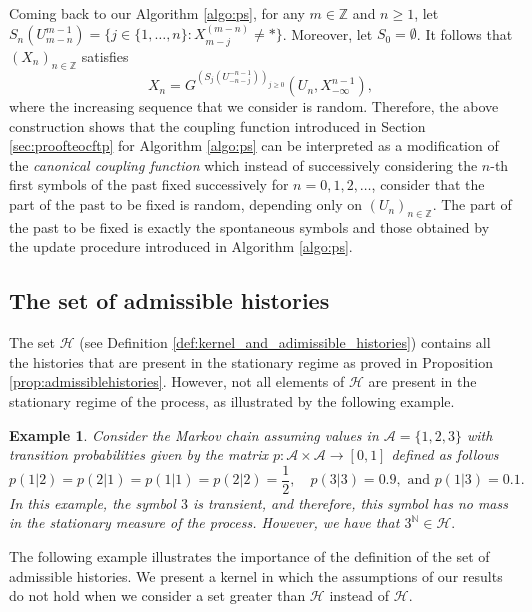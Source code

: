 \documentclass[a4paper]{article}
\newtheorem{example}[theorem]{Example}
\newcommand{\Z}{\mathbb{Z}}
\newcommand{\N}{\mathbb{N}}
\renewcommand{\H}{\mathcal{H}}
\newcommand{\A}{\mathcal{A}}
\begin{document}
Coming back to our Algorithm \ref{algo:ps}, for any $m\in \Z$ and $n\geq 1$, let $S_n(U_{m-n}^{m-1})=\{j\in \{1,\ldots,n\}: X^{(m-n)}_{m-j}\neq *\}$. Moreover, let $S_0=\emptyset$.
It follows that $(X_n)_{n\in \Z}$ satisfies
$$
X_n=G^{(S_j(U_{-n-j}^{-n-1}))_{j\geq 0}}(U_n,X_{-\infty}^{n-1}),
$$
where the increasing sequence that we consider is random. Therefore, the above construction shows that the coupling function introduced in Section \ref{sec:proofteocftp} for Algorithm \ref{algo:ps} can be interpreted as a modification of the \textit{canonical coupling function} which instead of successively considering the $n$-th first symbols of the past fixed successively for $n=0,1,2,\ldots$, consider that the part of the past to be fixed is random, depending only on $(U_n)_{n\in \Z}$. The part of the past to be fixed is exactly the spontaneous symbols and those obtained by the update procedure introduced in Algorithm \ref{algo:ps}.

\subsection{The set of admissible histories}

The set $\H$ (see Definition \ref{def:kernel_and_adimissible_histories}) contains all the  histories that are present in the stationary regime as proved in Proposition \ref{prop:admissiblehistories}. However, not all elements of $\H$ are present in the stationary regime of the process, as illustrated by the following example.

\begin{example}
Consider the Markov chain assuming values in $\A=\{1,2,3\}$ with transition probabilities given by the matrix $p:\A\times\A\to [0,1]$ defined as follows
$$
p(1|2)=p(2|1)=p(1|1)=p(2|2)=\frac{1}{2}, \quad  p(3|3)=0.9, \text{ and } p(1|3)=0.1.
$$
In this example, the symbol $3$ is transient, and therefore, this symbol has no mass in the stationary measure of the process. However, we have that
$3^{\N} \in \H.$
\end{example}

The following example illustrates the importance of the definition of the set of admissible histories. 
We present a kernel in which the assumptions of our results do not hold when we consider a set greater than $\H$ instead of $\H$.

\end{document}
